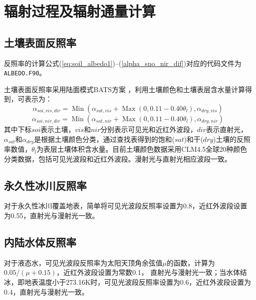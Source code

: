 \chapter{辐射过程及辐射通量计算}
\section{土壤表面反照率}
反照率的计算公式(\ref{eq:soil_albedo1})--(\ref{alpha_sno_nir_dif})对应的代码文件为\texttt{ALBEDO.F90}。

土壤表面反照率采用陆面模式BATS方案 \citep{dickinson1986biosphere,dickinson1993biosphere}，利用土壤颜色和土壤表层含水量计算得到，可表示为：
\begin{equation}\label{eq:soil_albedo1}
\alpha_{soi,vis,dir}=\operatorname{Min}\left(\alpha_{sat, vis}+\operatorname{Max}\left(0,0.11-0.40 \theta_{l}\right), \alpha_{dry, vis}\right)
\end{equation}
\begin{equation}
\alpha_{soi,nir,dir}=\operatorname{Min}\left(\alpha_{sat, nir}+\operatorname{Max}\left(0,0.11-0.40 \theta_{l}\right), \alpha_{dry, nir}\right)
\end{equation}
其中下标$soi$表示土壤，$vis$和$nir$分别表示可见光和近红外波段，$dir$表示直射光，$\alpha_{sat}$和$\alpha_{d r y}$是根据土壤颜色分类，通过查找表得到的饱和($sat$)和干($dry$)土壤的反照率数值，$\theta_{l}$为表层土壤体积含水量。目前土壤颜色数据采用CLM4.5全球20种颜色分类数据，包括可见光波段和近红外波段。漫射光与直射光相应波段一致。

\section{永久性冰川反照率}
对于永久性冰川覆盖地表，简单将可见光波段反照率设置为0.8，近红外波段设置为0.55，直射光与漫射光一致。


\section{内陆水体反照率}
对于液态水，可见光波段反照率为太阳天顶角余弦值$\mu$的函数，计算为$0.05/(\mu+0.15)$，近红外波段设置为常数0.1，
直射光与漫射光一致；当水体结冰，即地表温度小于273.16K时，可见光波段反照率设置为0.6，近红外波段设置为0.4，直射光与漫射光一致。

